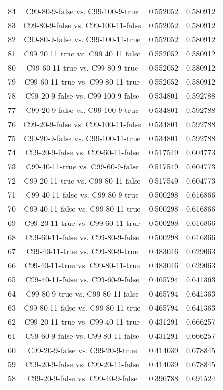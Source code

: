 \documentclass[a4paper,10pt]{article}
\begin{document}
\begin{landscape}
\begin{table}[!htp]
\begin{tabular}{cccc}
84&C99-80-9-false vs. C99-100-9-true&0.552052&0.580912\\
83&C99-80-9-false vs. C99-100-11-false&0.552052&0.580912\\
82&C99-80-9-false vs. C99-100-11-true&0.552052&0.580912\\
81&C99-20-11-true vs. C99-40-11-false&0.552052&0.580912\\
80&C99-60-11-true vs. C99-80-9-true&0.552052&0.580912\\
79&C99-60-11-true vs. C99-80-11-true&0.552052&0.580912\\
78&C99-20-9-false vs. C99-100-9-false&0.534801&0.592788\\
77&C99-20-9-false vs. C99-100-9-true&0.534801&0.592788\\
76&C99-20-9-false vs. C99-100-11-false&0.534801&0.592788\\
75&C99-20-9-false vs. C99-100-11-true&0.534801&0.592788\\
74&C99-20-9-false vs. C99-60-11-false&0.517549&0.604773\\
73&C99-40-11-true vs. C99-60-9-false&0.517549&0.604773\\
72&C99-20-11-true vs. C99-80-11-false&0.517549&0.604773\\
71&C99-40-11-false vs. C99-80-9-true&0.500298&0.616866\\
70&C99-40-11-false vs. C99-80-11-true&0.500298&0.616866\\
69&C99-20-11-true vs. C99-60-11-true&0.500298&0.616866\\
68&C99-60-11-false vs. C99-80-9-false&0.500298&0.616866\\
67&C99-40-11-true vs. C99-80-9-true&0.483046&0.629063\\
66&C99-40-11-true vs. C99-80-11-true&0.483046&0.629063\\
65&C99-40-11-false vs. C99-60-9-false&0.465794&0.641363\\
64&C99-80-9-true vs. C99-80-11-false&0.465794&0.641363\\
63&C99-80-11-false vs. C99-80-11-true&0.465794&0.641363\\
62&C99-20-11-true vs. C99-40-11-true&0.431291&0.666257\\
61&C99-60-9-false vs. C99-80-11-false&0.431291&0.666257\\
60&C99-20-9-false vs. C99-20-9-true&0.414039&0.678845\\
59&C99-20-9-false vs. C99-20-11-false&0.414039&0.678845\\
58&C99-20-9-false vs. C99-40-9-false&0.396788&0.691524\\

\end{tabular}
\end{table}
\end{landscape}
\end{document}
